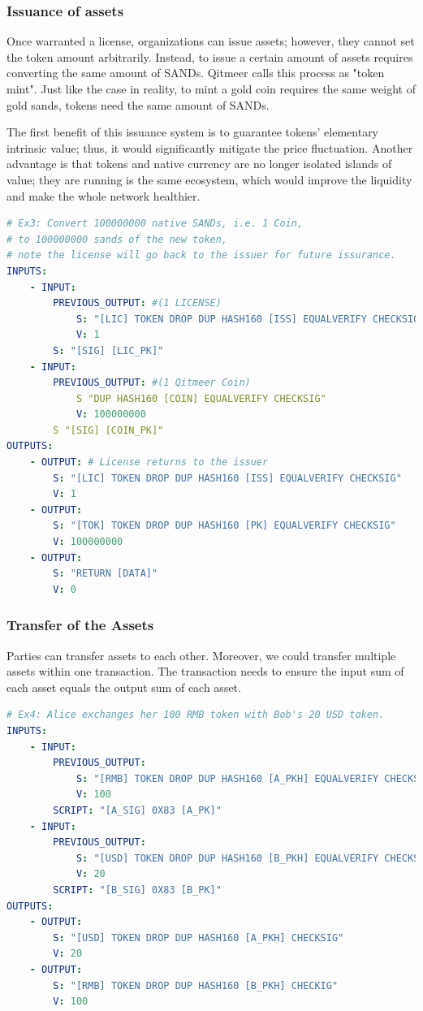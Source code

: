 \documentclass[a4paper,11pt]{article}
\begin{document}
\subsubsection{Issuance of assets}
Once warranted a license, organizations can issue assets; however, they cannot set the token amount arbitrarily. Instead, to issue a certain amount of assets requires converting the same amount of  SANDs. Qitmeer calls this process as  "token mint". Just like the case in reality,  to mint a gold coin requires the same weight of gold sands, tokens need the same amount of SANDs. 

The first benefit of this issuance system is to guarantee tokens' elementary intrinsic value; thus, it would significantly mitigate the price fluctuation. Another advantage is that tokens and native currency are no longer isolated islands of value; they are running is the same ecosystem, which would improve the liquidity and make the whole network healthier.

\lstset{basicstyle=\tiny,style=myListStyle}
\begin{lstlisting}[language=yaml, numbers=none,basicstyle=\footnotesize]
# Ex3: Convert 100000000 native SANDs, i.e. 1 Coin, 
# to 100000000 sands of the new token, 
# note the license will go back to the issuer for future issurance.
INPUTS:
	- INPUT:
		PREVIOUS_OUTPUT: #(1 LICENSE)
			S: "[LIC] TOKEN DROP DUP HASH160 [ISS] EQUALVERIFY CHECKSIG"
			V: 1
		S: "[SIG] [LIC_PK]"
	- INPUT:
		PREVIOUS_OUTPUT: #(1 Qitmeer Coin)
			S "DUP HASH160 [COIN] EQUALVERIFY CHECKSIG"
			V: 100000000
		S "[SIG] [COIN_PK]"
OUTPUTS:
	- OUTPUT: # License returns to the issuer
		S: "[LIC] TOKEN DROP DUP HASH160 [ISS] EQUALVERIFY CHECKSIG"
		V: 1
	- OUTPUT:
		S: "[TOK] TOKEN DROP DUP HASH160 [PK] EQUALVERIFY CHECKSIG"
		V: 100000000
	- OUTPUT:
		S: "RETURN [DATA]"
		V: 0
\end{lstlisting}

\subsubsection{Transfer of the Assets}

Parties can transfer assets to each other. Moreover, we could transfer multiple assets within one transaction. The transaction needs to ensure the input sum of each asset equals the output sum of each asset.

\lstset{basicstyle=\tiny,style=myListStyle}
\begin{lstlisting}[language=yaml, numbers=none,basicstyle=\footnotesize]
# Ex4: Alice exchanges her 100 RMB token with Bob's 20 USD token.
INPUTS:
	- INPUT:
		PREVIOUS_OUTPUT:
			S: "[RMB] TOKEN DROP DUP HASH160 [A_PKH] EQUALVERIFY CHECKSIG"
			V: 100
		SCRIPT: "[A_SIG] 0X83 [A_PK]"
	- INPUT:
		PREVIOUS_OUTPUT:
			S: "[USD] TOKEN DROP DUP HASH160 [B_PKH] EQUALVERIFY CHECKSIG"
			V: 20
		SCRIPT: "[B_SIG] 0X83 [B_PK]"
OUTPUTS:
	- OUTPUT:
		S: "[USD] TOKEN DROP DUP HASH160 [A_PKH] CHECKSIG"
		V: 20
	- OUTPUT:
		S: "[RMB] TOKEN DROP DUP HASH160 [B_PKH] CHECKIG"
		V: 100
\end{lstlisting}
\end{document}
